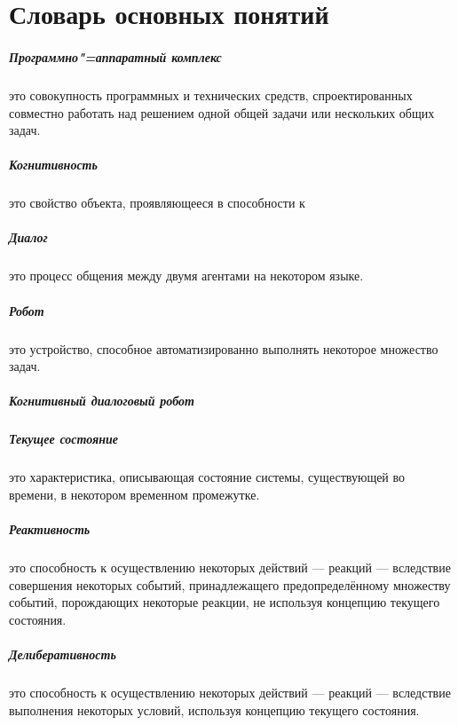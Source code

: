 \chapter*{Словарь основных понятий}
\thispagestyle{plain}
\paragraph*{Программно"=аппаратный комплекс} это совокупность программных и технических средств, спроектированных совместно работать над решением одной общей задачи или нескольких общих задач.

\paragraph*{Когнитивность} это свойство объекта, проявляющееся в способности к  

\paragraph*{Диалог} это процесс общения между двумя агентами на некотором языке.

\paragraph*{Робот} это устройство, способное автоматизированно выполнять некоторое множество задач.

\paragraph*{Когнитивный диалоговый робот}

\paragraph*{Текущее состояние} это характеристика, описывающая состояние системы, существующей во времени, в некотором временном промежутке.

\paragraph*{Реактивность} это способность к осуществлению некоторых действий --- реакций --- вследствие совершения некоторых событий, принадлежащего предопределённому множеству событий, порождающих некоторые реакции, не используя концепцию текущего состояния.
\paragraph*{Делиберативность} это способность к осуществлению некоторых действий --- реакций --- вследствие выполнения некоторых условий, используя концепцию текущего состояния.

